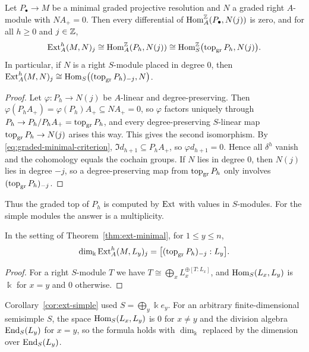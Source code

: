 \begin{theorem}\label{thm:ext-minimal}
Let $P_\bullet\to M$ be a minimal graded projective resolution and $N$ a graded right $A$-module with $NA_+=0$.
Then every differential of $\operatorname{Hom}\nolimits_A^{\mathbb{Z}}(P_\bullet,N(j))$ is zero, and for all $h\geq0$ and $j\in\mathbb{Z}$,
\[
\operatorname{Ext}\nolimits_A^h(M,N)_j\cong\operatorname{Hom}\nolimits_A^{\mathbb{Z}}(P_h,N(j))\cong\operatorname{Hom}\nolimits_S^{\mathbb{Z}}\bigl(\operatorname{top}\nolimits_{\mathrm{gr}} P_h,N(j)\bigr).
\]
In particular, if $N$ is a right $S$-module placed in degree $0$, then $\operatorname{Ext}\nolimits_A^h(M,N)_j\cong\operatorname{Hom}\nolimits_S\bigl((\operatorname{top}\nolimits_{\mathrm{gr}} P_h)_{-j},N\bigr)$.
\end{theorem}

\begin{proof}
Let $\varphi:P_h\to N(j)$ be $A$-linear and degree-preserving.
Then $\varphi(P_hA_+)=\varphi(P_h)A_+\subseteq NA_+=0$, so $\varphi$ factors uniquely through $P_h\to P_h/P_hA_+=\operatorname{top}\nolimits_{\mathrm{gr}} P_h$, and every degree-preserving $S$-linear map $\operatorname{top}\nolimits_{\mathrm{gr}} P_h\to N(j)$ arises this way.
This gives the second isomorphism.
By \eqref{eq:graded-minimal-criterion}, $\Im d_{h+1}\subseteq P_hA_+$, so $\varphi d_{h+1}=0$.
Hence all $\delta^h$ vanish and the cohomology equals the cochain groups.
If $N$ lies in degree $0$, then $N(j)$ lies in degree $-j$, so a degree-preserving map from $\operatorname{top}\nolimits_{\mathrm{gr}} P_h$ only involves $(\operatorname{top}\nolimits_{\mathrm{gr}} P_h)_{-j}$.
\end{proof}

Thus the graded top of $P_h$ is computed by $\operatorname{Ext}\nolimits$ with values in $S$-modules.
For the simple modules the answer is a multiplicity.

\begin{corollary}\label{cor:ext-simple}
In the setting of Theorem~\ref{thm:ext-minimal}, for $1\leq y\leq n$,
\[
\dim_\Bbbk\operatorname{Ext}\nolimits_A^h(M,L_y)_j=\bigl[(\operatorname{top}\nolimits_{\mathrm{gr}} P_h)_{-j}:L_y\bigr].
\]
\end{corollary}

\begin{proof}
For a right $S$-module $T$ we have $T\cong\bigoplus_x L_x^{\oplus[T:L_x]}$, and $\operatorname{Hom}\nolimits_S(L_x,L_y)$ is $\Bbbk$ for $x=y$ and $0$ otherwise.
\end{proof}

\begin{remark}[General $S$]\label{rem:ext-general-S}
Corollary~\ref{cor:ext-simple} used $S=\bigoplus_y\Bbbk e_y$.
For an arbitrary finite-dimensional semisimple $S$, the space $\operatorname{Hom}\nolimits_S(L_x,L_y)$ is $0$ for $x\neq y$ and the division algebra $\operatorname{End}\nolimits_S(L_y)$ for $x=y$, so the formula holds with $\dim_\Bbbk$ replaced by the dimension over $\operatorname{End}\nolimits_S(L_y)$.
\end{remark}

